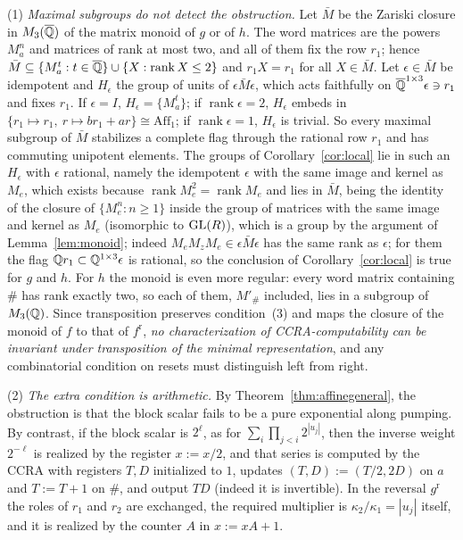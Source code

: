 \begin{remark}\label{rem:localcond}
(1) \emph{Maximal subgroups do not detect the obstruction.} Let $\bar M$ be the Zariski closure in $M_3(\overline{\mathbb{Q}})$ of the matrix monoid of $g$ or of $h$. The word matrices are the powers $M_a^n$ and matrices of rank at most two, and all of them fix the row $r_1$; hence $\bar M\subseteq\{M_a^t:t\in\overline{\mathbb{Q}}\}\cup\{X:\operatorname{rank}X\le2\}$ and $r_1X=r_1$ for all $X\in\bar M$. Let $\epsilon\in\bar M$ be idempotent and $H_\epsilon$ the group of units of $\epsilon\bar M\epsilon$, which acts faithfully on $\overline{\mathbb{Q}}^{1\times3}\epsilon\ni r_1$ and fixes $r_1$. If $\epsilon=I$, $H_\epsilon=\{M_a^t\}$; if $\operatorname{rank}\epsilon=2$, $H_\epsilon$ embeds in $\{r_1\mapsto r_1,\ r\mapsto br_1+ar\}\cong\mathrm{Aff}_1$; if $\operatorname{rank}\epsilon=1$, $H_\epsilon$ is trivial. So every maximal subgroup of $\bar M$ stabilizes a complete flag through the rational row $r_1$ and has commuting unipotent elements. The groups of Corollary~\ref{cor:local} lie in such an $H_\epsilon$ with $\epsilon$ rational, namely the idempotent $\epsilon$ with the same image and kernel as $M_e$, which exists because $\operatorname{rank}M_e^2=\operatorname{rank}M_e$ and lies in $\bar M$, being the identity of the closure of $\{M_e^n:n\ge1\}$ inside the group of matrices with the same image and kernel as $M_e$ (isomorphic to $\mathrm{GL}(R)$), which is a group by the argument of Lemma~\ref{lem:monoid}; indeed $M_eM_zM_e\in\epsilon\bar M\epsilon$ has the same rank as $\epsilon$; for them the flag $\mathbb{Q} r_1\subset\mathbb{Q}^{1\times3}\epsilon$ is rational, so the conclusion of Corollary~\ref{cor:local} is true for $g$ and $h$. For $h$ the monoid is even more regular: every word matrix containing $\#$ has rank exactly two, so each of them, $M'_\#$ included, lies in a subgroup of $M_3(\mathbb{Q})$. Since transposition preserves condition~(3) and maps the closure of the monoid of $f$ to that of $f^{\mathrm r}$, \emph{no characterization of CCRA-computability can be invariant under transposition of the minimal representation}, and any combinatorial condition on resets must distinguish left from right.

(2) \emph{The extra condition is arithmetic.} By Theorem~\ref{thm:affinegeneral}, the obstruction is that the block scalar fails to be a pure exponential along pumping. By contrast, if the block scalar is $2^\ell$, as for $\sum_i\prod_{j<i}2^{|u_j|}$, then the inverse weight $2^{-\ell}$ is realized by the register $x:=x/2$, and that series is computed by the CCRA with registers $T,D$ initialized to $1$, updates $(T,D):=(T/2,2D)$ on $a$ and $T:=T+1$ on $\#$, and output $TD$ (indeed it is invertible). In the reversal $g^{\mathrm r}$ the roles of $r_1$ and $r_2$ are exchanged, the required multiplier is $\kappa_2/\kappa_1=|u_j|$ itself, and it is realized by the counter $A$ in $x:=xA+1$.
\end{remark}

